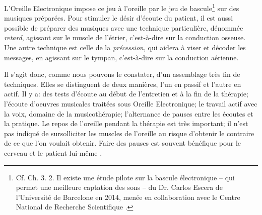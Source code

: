 L'Oreille Electronique impose ce jeu à l'oreille par le jeu de
bascule\footnote{Cf. Ch. 3. 2. Il existe une étude pilote sur la bascule électronique -- qui permet
une meilleure
captation des sons -- du Dr. Carlos Escera
de l'Université de Barcelone en 2014, menée en collaboration avec le
Centre National de Recherche Scientifique
\href{http://tomatisassociation.org/scientific-validation-of-the-tomatis-effect-
eeg-recordings-of-sound-from-brainstem-to-cerebral-cortex-encoding-university-of
-barcelona-2014/}\autocite{tomatisassociation.org}.} sur des musiques préparées.
Pour stimuler le désir d'écoute
du patient, il est aussi possible de préparer des musiques avec une
technique particulière, dénommée \emph{retard}, agissant sur le muscle de
l'étrier, c'est-à-dire sur la conduction osseuse. Une autre technique
est celle de la \emph{précession}, qui aidera à viser et décoder les messages,
en agissant sur le tympan, c'est-à-dire sur la conduction aérienne.

Il s'agit donc, comme nous pouvons le constater, d'un assemblage très
fin de techniques.
Elles se distinguent de deux manières,
l'un en passif et l'autre en actif.
Il y a:
des tests d'écoute au début de l'entretien et à la fin de la thérapie;
l'écoute d'oeuvres musicales traitées sous Oreille Electronique;
 le travail actif avec la voix, domaine de la musicothérapie;
l'alternance de pauses entre les écoutes et la pratique.
Le repos de l'oreille pendant la thérapie est très important; il n'est
pas indiqué de
sursolliciter les muscles de l'oreille au risque d'obtenir le
contraire de ce que l'on voulait obtenir. Faire des pauses est
souvent bénéfique pour le cerveau et le patient lui-même \autocite{tomatis_conf1972}.

  



